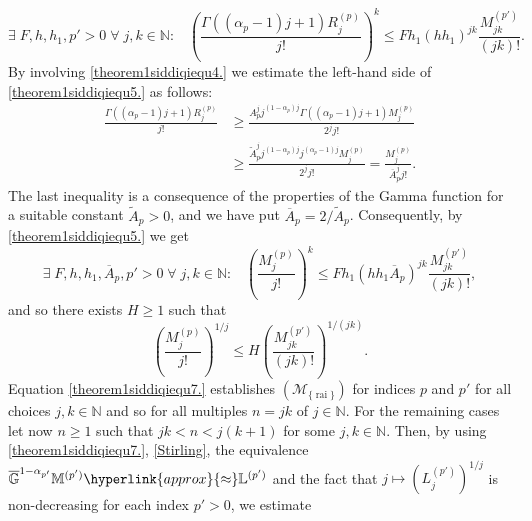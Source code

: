 \documentclass[11pt,a4paper]{article}
\theoremstyle{plain}
\theoremstyle{definition}
\newcommand{\NN}{\mathbb{N}}
\newcommand{\M}{\mathbb{M}}
\newcommand{\LL}{\mathbb{L}}
\newcommand{\G}{\mathbb{G}}
\let\on=\operatorname
\begin{document}
\begin{equation}\label{theorem1siddiqiequ5.}
\exists\;F,h,h_1,p'>0\;\forall\;j,k\in\NN:\;\;\;\left(\frac{\Gamma((\alpha_p-1)j+1)R_j^{(p)}}{j!}\right)^{k}\le Fh_1(hh_1)^{jk}\frac{M^{(p')}_{jk}}{(jk)!}.
\end{equation}
By involving \eqref{theorem1siddiqiequ4.} we estimate the left-hand side of \eqref{theorem1siddiqiequ5.} as follows:
\begin{align*}
\frac{\Gamma((\alpha_p-1)j+1)R_j^{(p)}}{j!}& \ge\frac{A_p^jj^{(1-\alpha_p)j}\Gamma((\alpha_p-1)j+1)M^{(p)}_j}{2^jj!}
	\\&
\ge\frac{{\widetilde{A}^j_p}j^{(1-\alpha_p)j}j^{(\alpha_p-1)j}M^{(p)}_j}{2^jj!}= \frac{M^{(p)}_j}{{\overline{A}^j_p}j!}.
\end{align*}
The last inequality is a consequence of the properties of the Gamma function for a suitable constant $\widetilde{A}_p>0$, and we have put $\overline{A}_p=2/\widetilde{A}_p$. Consequently, by \eqref{theorem1siddiqiequ5.} we get
\begin{equation*}%
\exists\;F,h,h_1,\overline{A}_p,p'>0\;\forall\;j,k\in\NN:\;\;\;\left(\frac{M^{(p)}_j}{j!}\right)^k\le Fh_1(hh_1\overline{A}_p)^{jk}\frac{M^{(p')}_{jk}}{(jk)!},
\end{equation*}
and so there exists $H\ge 1$ such that
\begin{equation}\label{theorem1siddiqiequ7.}
\left(\frac{M^{(p)}_j}{j!}\right)^{1/j}\le H\left(\frac{M^{(p')}_{jk}}{(jk)!}\right)^{1/(jk)}.
\end{equation}
{Equation} \eqref{theorem1siddiqiequ7.} establishes \hyperlink{R-rai}{$(\mathcal{M}_{\{\on{rai}\}})$} for indices $p$ and $p'$ for all choices $j,k\in\NN$ and so for all multiples $n=jk$ of $j\in\NN$. For the remaining cases let now $n\ge 1$ such that $jk<n<j(k+1)$ for some $j,k\in\NN$. Then, by using \eqref{theorem1siddiqiequ7.}, \eqref{Stirling}, the equivalence $\overline{\G}^{1-\alpha_{p'}}\M^{(p')}\hyperlink{approx}{\approx} \LL^{(p')}$ and the fact that $j\mapsto(L_j^{(p')})^{1/j}$
is non-decreasing for each index $p'>0$, we estimate
\end{document}
